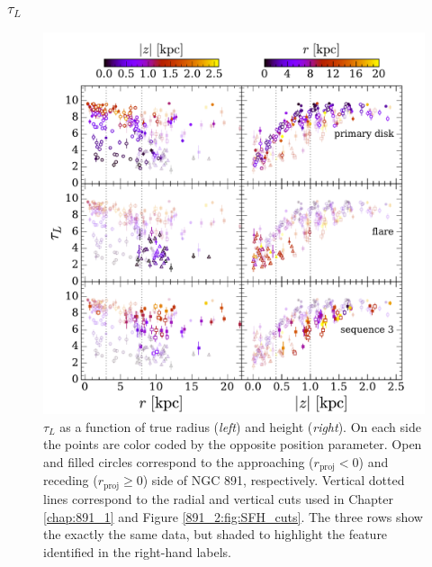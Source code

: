 



\subsubsection{{\Large $\tau_L$}}
\begin{figure}
  \centering
  \includegraphics[width=\textwidth]{891_2/figs/MLWA_rz_all.pdf}
  \caption[$\tau_L$ vs
  ($r,|z|$)]{\fixspacing\label{891_2:fig:MLWA_rz}$\tau_L$ as a
    function of true radius (\emph{left}) and height
    (\emph{right}). On each side the points are color coded by the
    opposite position parameter. Open and filled circles correspond to
    the approaching ($r_\mathrm{proj} < 0$) and receding
    ($r_\mathrm{proj}\geq 0$) side of NGC 891, respectively. Vertical
    dotted lines correspond to the radial and vertical cuts used in
    Chapter \ref{chap:891_1} and Figure \ref{891_2:fig:SFH_cuts}. The
    three rows show the exactly the same data, but shaded to highlight
    the feature identified in the right-hand labels.}
\end{figure}

